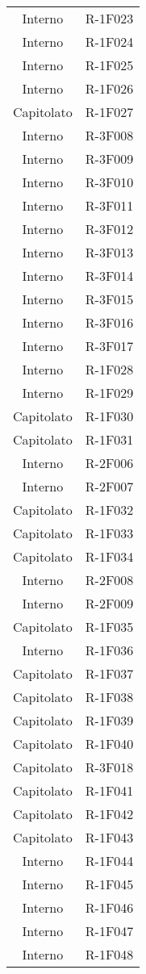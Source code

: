 \begin{tabularx}{\textwidth}{c|c}
		Interno & R-1F023 \\
		Interno & R-1F024 \\
		Interno & R-1F025 \\
		Interno & R-1F026 \\
		Capitolato & R-1F027 \\
		Interno & R-3F008 \\
		Interno & R-3F009 \\
		Interno & R-3F010 \\
		Interno & R-3F011 \\
		Interno & R-3F012 \\
		Interno & R-3F013 \\
		Interno & R-3F014 \\
		Interno & R-3F015 \\
		Interno & R-3F016 \\
		Interno & R-3F017 \\
		Interno & R-1F028 \\
		Interno & R-1F029 \\
		Capitolato & R-1F030 \\
		Capitolato & R-1F031 \\
		Interno & R-2F006 \\
		Interno & R-2F007 \\
		Capitolato & R-1F032 \\
		Capitolato & R-1F033 \\
		Capitolato & R-1F034 \\
		Interno & R-2F008 \\
		Interno & R-2F009 \\
		Capitolato & R-1F035 \\
		Interno & R-1F036 \\
		Capitolato & R-1F037 \\
		Capitolato & R-1F038 \\
		Capitolato & R-1F039 \\
		Capitolato & R-1F040 \\
		Capitolato & R-3F018 \\
		Capitolato & R-1F041 \\
		Capitolato & R-1F042 \\
		Capitolato & R-1F043 \\
		Interno & R-1F044 \\
		Interno & R-1F045 \\
		Interno & R-1F046 \\
		Interno & R-1F047 \\
		Interno & R-1F048 \\

\end{tabularx}
